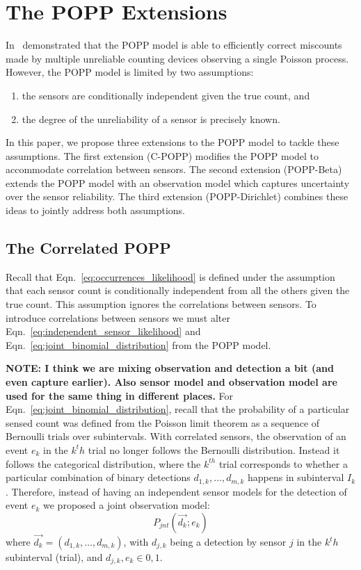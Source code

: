 
\section{The POPP Extensions}
\label{sec:popp_extensions}

In~\cite{jovan18a} demonstrated that the POPP model is able to efficiently correct miscounts made by multiple unreliable counting devices observing a single Poisson process. However, the POPP model is limited by two assumptions:
\begin{enumerate}
    \item the sensors are conditionally independent given the true count, and 
    \item the degree of the unreliability of a sensor is precisely known.
\end{enumerate}
In this paper, we propose three extensions to the POPP model to tackle these assumptions. The first extension (C-POPP) modifies the POPP model to accommodate correlation between sensors. The second extension (POPP-Beta) extends the POPP model with an observation model which captures uncertainty over the sensor reliability. The third extension (POPP-Dirichlet) combines these ideas to jointly address both assumptions. 

\subsection{The Correlated POPP}
\label{subsec:cpop}

Recall that Eqn.~\ref{eq:occurrences_likelihood} is defined under the assumption that each sensor count is conditionally independent from all the others given the true count. This assumption ignores the correlations between sensors. 
% 
To introduce correlations between sensors we must alter Eqn.~\ref{eq:independent_sensor_likelihood} and
Eqn.~\ref{eq:joint_binomial_distribution} from the POPP model.

\textbf{NOTE: I think we are mixing observation and detection a bit (and even capture earlier). Also sensor model and observation model are used for the same thing in different places.}
For Eqn.~\ref{eq:joint_binomial_distribution}, recall that the probability of a particular sensed count was defined from the Poisson limit theorem as a sequence of Bernoulli trials over subintervals.
% 
With correlated sensors, the observation of an event $e_k$ in the 
$k^th$ trial no longer follows the Bernoulli distribution. Instead it follows the categorical distribution, where the $k^{th}$ trial corresponds to whether a particular combination of binary detections $d_{1,k}, \ldots, d_{m,k}$ happens in subinterval $I_k$. Therefore, instead of having an independent sensor models for the detection of event $e_k$ we proposed a joint observation model:
\begin{equation}
    \label{eq:joint_sensor_model}
    P_{jnt}(\vec{d_k} ; e_k)
\end{equation}    
\noindent where $ \vec{d_k} = (d_{1,k}, \ldots, d_{m,k})$, with $d_{j,k}$ being a detection by sensor $j$ in the $k^th$ subinterval (trial), and $d_{j,k}, e_k \in {0, 1}$. 

